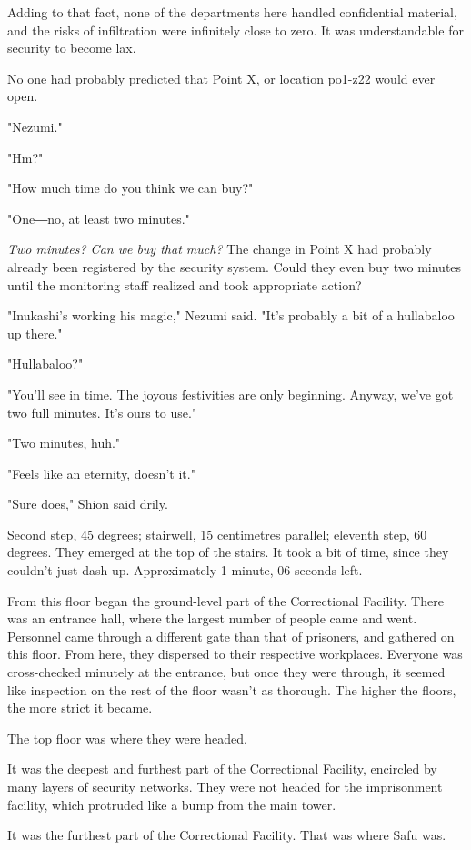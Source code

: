 Adding to that fact, none of the departments here handled confidential
material, and the risks of infiltration were infinitely close to zero.
It was understandable for security to become lax.

No one had probably predicted that Point X, or location po1-z22 would
ever open.

"Nezumi."

"Hm?"

"How much time do you think we can buy?"

"One―no, at least two minutes."

\emph{Two minutes? Can we buy that much?} The change in Point X had probably
already been registered by the security system. Could they even buy two
minutes until the monitoring staff realized and took appropriate action?

"Inukashi's working his magic," Nezumi said. "It's probably a bit of a
hullabaloo up there."

"Hullabaloo?"

"You'll see in time. The joyous festivities are only beginning. Anyway,
we've got two full minutes. It's ours to use."

"Two minutes, huh."

"Feels like an eternity, doesn't it."

"Sure does," Shion said drily.

Second step, 45 degrees; stairwell, 15 centimetres parallel; eleventh
step, 60 degrees. They emerged at the top of the stairs. It took a bit
of time, since they couldn't just dash up. Approximately 1 minute, 06
seconds left.

From this floor began the ground-level part of the Correctional
Facility. There was an entrance hall, where the largest number of people
came and went. Personnel came through a different gate than that of
prisoners, and gathered on this floor. From here, they dispersed to
their respective workplaces. Everyone was cross-checked minutely at the
entrance, but once they were through, it seemed like inspection on the
rest of the floor wasn't as thorough. The higher the floors, the more
strict it became.

The top floor was where they were headed.

It was the deepest and furthest part of the Correctional Facility,
encircled by many layers of security networks. They were not headed for
the imprisonment facility, which protruded like a bump from the main
tower.

It was the furthest part of the Correctional Facility. That was where
Safu was.

